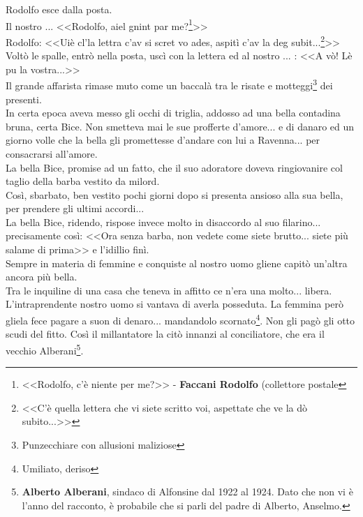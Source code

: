 \indent Rodolfo esce dalla posta.\\
\indent Il nostro .\:.\:.\: <<Rodolfo, aiel gnint par me?\footnote{<<Rodolfo, c'è niente per me?>> - \textbf{Faccani Rodolfo} (collettore postale}>>\\
\indent Rodolfo: <<Uiè cl'la lettra c'av si scret vo ades, aspitì c'av la deg subit...\footnote{<<C'è quella lettera che vi siete scritto voi, aspettate che ve la dò subito...>>}>>\\
\indent Voltò le spalle, entrò nella posta, uscì con la lettera ed al nostro .\:.\:.\: : <<A vò! Lè pu la vostra...>>\\
\indent Il grande affarista rimase muto come un baccalà tra le risate e motteggi\footnote{Punzecchiare con allusioni maliziose} dei presenti.\\
\indent In certa epoca aveva messo gli occhi di triglia, addosso ad una bella contadina bruna, certa Bice. Non smetteva mai le sue profferte d'amore... e di danaro ed un giorno volle che la bella gli promettesse d'andare con lui a Ravenna... per consacrarsi all'amore.\\
\indent La bella Bice, promise ad un fatto, che il suo adoratore doveva ringiovanire col taglio della barba vestito da milord.\\
\indent Così, sbarbato, ben vestito pochi giorni dopo si presenta ansioso alla sua bella, per prendere gli ultimi accordi...\\
\indent La bella Bice, ridendo, rispose invece molto in disaccordo al suo filarino... precisamente così: <<Ora senza barba, non vedete come siete brutto... siete più salame di prima>> e l'idillio finì.\\
\indent Sempre in materia di femmine e conquiste al nostro uomo gliene capitò un'altra ancora più bella.\\
\indent Tra le inquiline di una casa che teneva in affitto ce n'era una molto... libera. L'intraprendente nostro uomo si vantava di averla posseduta. La femmina però gliela fece pagare a suon di denaro... mandandolo scornato\footnote{Umiliato, deriso}. Non gli pagò gli otto scudi del fitto. Così il millantatore la citò innanzi al conciliatore, che era il vecchio Alberani\footnote{\textbf{Alberto Alberani}, sindaco di Alfonsine dal 1922 al 1924. Dato che non vi è l'anno del racconto, è probabile che si parli del padre di Alberto, Anselmo.}.\\
